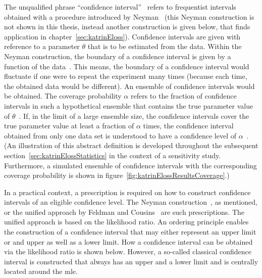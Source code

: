The unqualified phrase ``confidence interval''~\cite{ReviewOfParticlePhysics} refers to frequentist intervals obtained with a procedure introduced by Neyman~\cite{Neyman1937} (this Neyman construction is not shown in this thesis, instead another construction is given below, that finds application in chapter~\ref{sec:katrinEloss}). Confidence intervals are given with reference to a parameter $\theta$ that is to be estimated from the data. Within the Neyman construction, the boundary of a confidence interval is given by a function of the data~\cite{ReviewOfParticlePhysics}. This means, the boundary of a confidence interval would fluctuate if one were to repeat the experiment many times (because each time, the obtained data would be different). An ensemble of confidence intervals would be obtained. The coverage probability $\alpha$ refers to the fraction of confidence intervals in such a hypothetical ensemble that contains the true parameter value of $\theta$~\cite{ReviewOfParticlePhysics}. If, in the limit of a large ensemble size, the confidence intervals cover the true parameter value at least a fraction of $\alpha$ times, the confidence interval obtained from only one data set is understood to have a confidence level of $\alpha$~\cite{ReviewOfParticlePhysics}. (An illustration of this abstract definition is developed throughout the subsequent section~\ref{sec:katrinElossStatistics} in the context of a sensitivity study. Furthermore, a simulated ensemble of confidence intervals with the corresponding coverage probability is shown in figure~\ref{fig:katrinElossResultsCoverage}.)

In a practical context, a prescription is required on how to construct confidence intervals of an eligible confidence level. The Neyman construction~\cite{Neyman1937}, as mentioned, or the unified approach by Feldman and Cousins~\cite{Feldman1998} are such prescriptions. The unified approach is based on the likelihood ratio. An ordering principle enables the construction of a confidence interval that may either represent an upper limit or and upper as well as a lower limit. How a confidence interval can be obtained via the likelihood ratio is shown below. However, a so-called classical confidence interval is constructed that always has an upper and a lower limit and is centrally located around the \gls{mle}. 

